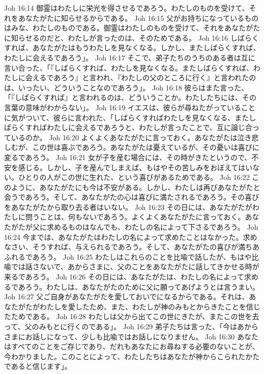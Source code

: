 Joh 16:14  御霊はわたしに栄光を得させるであろう。わたしのものを受けて、それをあなたがたに知らせるからである。
Joh 16:15  父がお持ちになっているものはみな、わたしのものである。御霊はわたしのものを受けて、それをあなたがたに知らせるのだと、わたしが言ったのは、そのためである。
Joh 16:16  しばらくすれば、あなたがたはもうわたしを見なくなる。しかし、またしばらくすれば、わたしに会えるであろう」。
Joh 16:17  そこで、弟子たちのうちのある者は互に言い合った、「『しばらくすれば、わたしを見なくなる。またしばらくすれば、わたしに会えるであろう』と言われ、『わたしの父のところに行く』と言われたのは、いったい、どういうことなのであろう」。
Joh 16:18  彼らはまた言った、「『しばらくすれば』と言われるのは、どういうことか。わたしたちには、その言葉の意味がわからない」。
Joh 16:19  イエスは、彼らが尋ねたがっていることに気がついて、彼らに言われた、「しばらくすればわたしを見なくなる、またしばらくすればわたしに会えるであろうと、わたしが言ったことで、互に論じ合っているのか。
Joh 16:20  よくよくあなたがたに言っておく。あなたがたは泣き悲しむが、この世は喜ぶであろう。あなたがたは憂えているが、その憂いは喜びに変るであろう。
Joh 16:21  女が子を産む場合には、その時がきたというので、不安を感じる。しかし、子を産んでしまえば、もはやその苦しみをおぼえてはいない。ひとりの人がこの世に生れた、という喜びがあるためである。
Joh 16:22  このように、あなたがたにも今は不安がある。しかし、わたしは再びあなたがたと会うであろう。そして、あなたがたの心は喜びに満たされるであろう。その喜びをあなたがたから取り去る者はいない。
Joh 16:23  その日には、あなたがたがわたしに問うことは、何もないであろう。よくよくあなたがたに言っておく。あなたがたが父に求めるものはなんでも、わたしの名によって下さるであろう。
Joh 16:24  今までは、あなたがたはわたしの名によって求めたことはなかった。求めなさい、そうすれば、与えられるであろう。そして、あなたがたの喜びが満ちあふれるであろう。
Joh 16:25  わたしはこれらのことを比喩で話したが、もはや比喩では話さないで、あからさまに、父のことをあなたがたに話してきかせる時が来るであろう。
Joh 16:26  その日には、あなたがたは、わたしの名によって求めるであろう。わたしは、あなたがたのために父に願ってあげようとは言うまい。
Joh 16:27  父ご自身があなたがたを愛しておいでになるからである。それは、あなたがたがわたしを愛したため、また、わたしが神のみもとからきたことを信じたためである。
Joh 16:28  わたしは父から出てこの世にきたが、またこの世を去って、父のみもとに行くのである」。
Joh 16:29  弟子たちは言った、「今はあからさまにお話しになって、少しも比喩ではお話しになりません。
Joh 16:30  あなたはすべてのことをご存じであり、だれもあなたにお尋ねする必要のないことが、今わかりました。このことによって、わたしたちはあなたが神からこられたかたであると信じます」。
